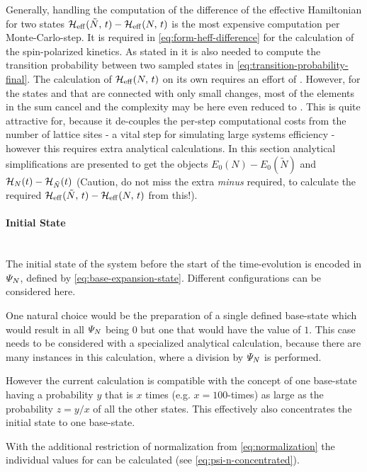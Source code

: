 Generally, handling the computation of the difference of the effective Hamiltonian for two states $\HeffOft[\tilde{N}]-\HeffOft[N]$ is the most expensive computation per Monte-Carlo-step.
It is required in \autoref{eq:form-heff-difference} for the calculation of the spin-polarized kinetics.
As stated in  it is also needed to compute the transition probability between two sampled states in \autoref{eq:transition-probability-final}.
The calculation of $\HeffOft[N]$ on its own requires an effort of .
However, for the states \ketN[N] and  that are connected with only small changes, most of the elements in the sum cancel and the complexity may be here even reduced to .
This is quite attractive for, because it de-couples the per-step computational costs from the number of lattice sites - a vital step for simulating large systems efficiency - however this requires extra analytical calculations.
In this section analytical simplifications are presented to get the objects $E_0(N)-E_0(\tilde{N})$ and $\HNOft - \HNOft[\tilde{N}]$ (Caution, do not miss the extra \emph{minus} required, to calculate the required $\HeffOft[\tilde{N}]-\HeffOft[N]$ from this!).

\paragraph*{Initial State} \makebox{}\\

The initial state of the system before the start of the time-evolution is encoded in $\psiN$, defined by \autoref{eq:base-expansion-state}. Different configurations can be considered here.

One natural choice would be the preparation of a single defined base-state which would result in all $\psiN$ being $0$ but one that would have the value of $1$. 
This case needs to be considered with a specialized analytical calculation, because there are many instances in this calculation, where a division by $\psiN$ is performed. 

However the current calculation is compatible with the concept of one base-state having a probability $y$ that is $x$ times (e.g. $x=100$-times) as large as the probability $z = y/x$ of all the other states.
This effectively also concentrates the initial state to one base-state.

With the additional restriction of normalization from \autoref{eq:normalization} the individual values for \psiN{} can be calculated (see \autoref{eq:psi-n-concentrated}).

